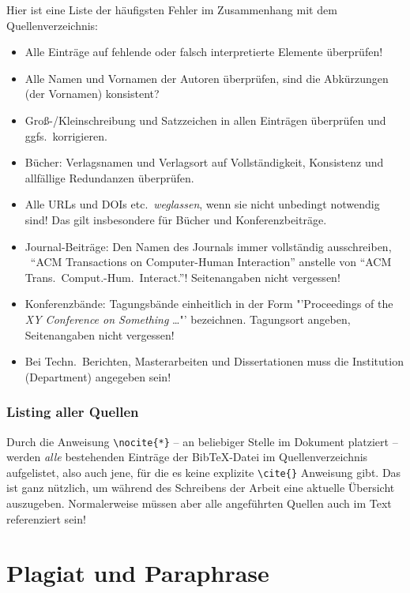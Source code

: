 Hier ist eine Liste der häufigsten Fehler im Zusammenhang mit dem Quellenverzeichnis:
%
\begin{itemize}
\item
Alle Einträge auf fehlende oder falsch interpretierte Elemente überprüfen!
\item
Alle Namen und Vornamen der Autoren überprüfen, sind die Abkürzungen (der Vornamen) konsistent?
\item
Groß-/Kleinschreibung und Satzzeichen in allen  Einträgen überprüfen und ggfs.\ korrigieren.
\item
Bücher: Verlagsnamen und Verlagsort auf Vollständigkeit, Konsistenz und allfällige
Redundanzen überprüfen.
\item
Alle URLs und DOIs etc.\ \emph{weglassen}, wenn sie nicht unbedingt notwendig sind! Das gilt insbesondere
für Bücher und Konferenzbeiträge.
\item
Journal-Beiträge: Den Namen des Journals immer vollständig ausschreiben, \zB\
"`ACM Transactions on Computer-Human Interaction"' anstelle von 
"`ACM Trans.\ Comput.-Hum.\ Interact."'! Seitenangaben nicht vergessen!
\item
Konferenzbände: 
Tagungsbände einheitlich in der Form "'Proceedings of the \emph{XY Conference on Something} \ldots"'
bezeichnen. Tagungsort angeben, Seitenangaben nicht vergessen!
\item
Bei Techn.\ Berichten, Masterarbeiten und Dissertationen muss die Institution (Department)
angegeben sein!
\end{itemize}
 

\subsubsection{Listing aller Quellen}

Durch die Anweisung \verb!\nocite{*}! -- an beliebiger Stelle im Dokument platziert -- werden \emph{alle} bestehenden Einträge der BibTeX-Datei im Quellenverzeichnis aufgelistet, also auch jene, für die es keine explizite \verb!\cite{}! Anweisung gibt. Das ist ganz nützlich, um während des Schreibens der Arbeit eine aktuelle Übersicht auszugeben. Normalerweise müssen aber alle angeführten Quellen auch im Text referenziert sein!



\section{Plagiat und Paraphrase}
\label{sec:Plagiarismus}

